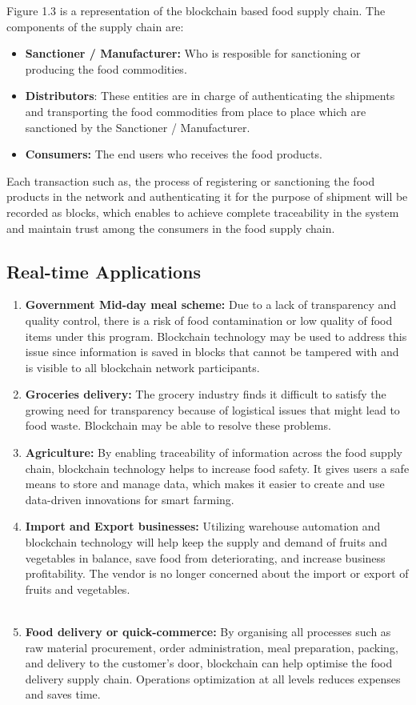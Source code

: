 \documentclass[12pt,a4paper,twocolumn,fleqn]{article}
\begin{document}
Figure 1.3 is a representation of the blockchain based food supply chain. 
The components of the supply chain are: 
\begin{itemize}
    \item \textbf{Sanctioner / Manufacturer:} Who is resposible for sanctioning or producing the food commodities.
    \item \textbf{Distributors}: These entities are in charge of authenticating the shipments and transporting the food commodities from place to place which are sanctioned by the Sanctioner / Manufacturer.
    \item \textbf{Consumers:} The end users who receives the food products.
\end{itemize}

Each transaction such as, the process of registering or sanctioning the food products in the network and authenticating it for the purpose of shipment will be recorded as blocks, which enables to achieve complete traceability in the system and maintain trust among the consumers in the food supply chain. \\
\subsection{Real-time Applications}
\begin{enumerate}
    \item \textbf{Government Mid-day meal scheme:} Due to a lack of transparency and quality control, there is a risk of food contamination or low quality of food items under this program. Blockchain technology may be used to address this issue since information is saved in blocks that cannot be tampered with and is visible to all blockchain network participants.
    \item \textbf{Groceries delivery:} The grocery industry finds it difficult to satisfy the growing need for transparency because of logistical issues that might lead to food waste. Blockchain may be able to resolve these problems.
    \item \textbf{Agriculture:} By enabling  traceability of information across the food supply chain, blockchain technology helps to increase food safety. It gives users a safe means to store and manage data, which makes it easier to create and use data-driven innovations for smart farming.
    \item \textbf{Import and Export businesses:} Utilizing warehouse automation and blockchain technology will help keep the supply and demand of fruits and vegetables in balance, save food from deteriorating, and increase business profitability. The vendor is no longer concerned about the import or export of fruits and vegetables. \\ \\
    \item \textbf{Food delivery or quick-commerce:} By organising all processes such as raw material procurement, order administration, meal preparation, packing, and delivery to the customer's door, blockchain can help optimise the food delivery supply chain. Operations optimization at all levels reduces expenses and saves time.
\end{enumerate} 
\end{document}
